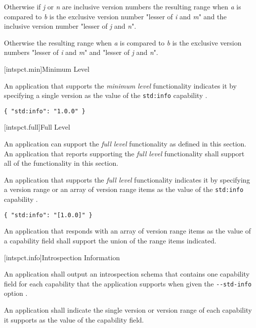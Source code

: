 \pnum
Otherwise if \emph{j} or \emph{n} are inclusive version numbers the resulting
range when \emph{a} is compared to \emph{b} is the exclusive version number
"lesser of \emph{i} and \emph{m}" and the inclusive version number "lesser of
\emph{j} and \emph{n}".

\pnum
Otherwise the resulting range when \emph{a} is compared to \emph{b} is the
exclusive version numbers "lesser of \emph{i} and \emph{m}" and "lesser of
\emph{j} and \emph{n}".

[intspct.min]{Minimum Level}

\pnum
An application that supports the \emph{minimum level} functionality indicates
it by specifying a single version  as the value of the
\verb|std:info| capability .

\begin{example}
\verb|{ "std:info": "1.0.0" }|
\end{example}

[intspct.full]{Full Level}

\pnum
An application can support the \emph{full level} functionality as defined in
this section. An application that reports supporting the \emph{full level}
functionality shall support all of the functionality in this section.

\pnum
An application that supports the \emph{full level} functionality indicates it by
specifying a version range  or an array of version
range items as the value of the \verb|std:info| capability  .

\begin{example}
\verb|{ "std:info": "[1.0.0]" }|
\end{example}

An application that responds with an array of version range items as the value
of a capability field shall support the union of the range items indicated.

[intspct.info]{Introspection Information}

\pnum
An application shall output an introspection schema  that
contains one capability field for each capability that the application supports
when given the \verb|--std-info| option .

\pnum
An application shall indicate the single version  or
version range  of each capability it supports as the
value of the capability field.


